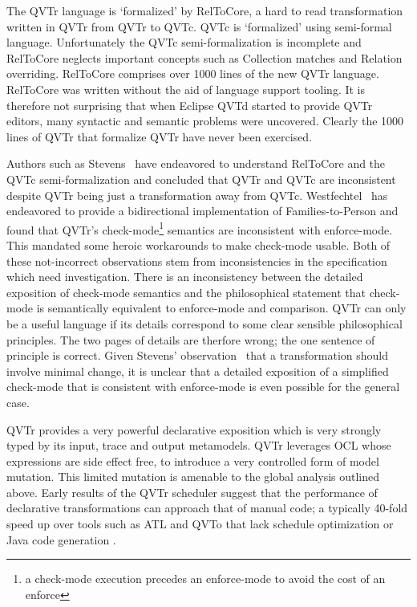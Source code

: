 \documentclass{llncs}
\begin{document}
The QVTr language is `formalized' by RelToCore, a hard to read transformation written in QVTr from QVTr to QVTc. QVTc is `formalized' using semi-formal language. Unfortunately the QVTc semi-formalization is incomplete and RelToCore neglects important concepts such as Collection matches and Relation overriding. RelToCore comprises over 1000 lines of the new QVTr language. RelToCore was written without the aid of language support tooling. It is therefore not surprising that when Eclipse QVTd started to provide QVTr editors, many syntactic and semantic problems were uncovered. Clearly the 1000 lines of QVTr that formalize QVTr have never been exercised.

Authors such as Stevens~\cite{Stevens-game} have endeavored to understand RelToCore and the QVTc semi-formalization and concluded that QVTr and QVTc are inconsistent despite QVTr being just a transformation away from QVTc. Westfechtel~\cite{Westfechtel} has endeavored to provide a bidirectional implementation of Families-to-Person and found that QVTr's check-mode\footnote{a check-mode execution precedes an enforce-mode to avoid the cost of an enforce} semantics are inconsistent with enforce-mode. This mandated some heroic workarounds to make check-mode usable. Both of these not-incorrect observations stem from inconsistencies in the specification which need investigation. There is an inconsistency between the detailed exposition of check-mode semantics and the philosophical statement that check-mode is semantically equivalent to enforce-mode and comparison. QVTr can only be a useful language if its details correspond to some clear sensible philosophical principles. The two pages of details are therfore wrong; the one sentence of principle is correct. Given Stevens' observation~\cite{Stevens-bitx} that a transformation should involve minimal change, it is unclear that a detailed exposition of a simplified check-mode that is consistent with enforce-mode is even possible for the general case.

QVTr provides a very powerful declarative exposition which is very strongly typed by its input, trace and output metamodels. QVTr leverages OCL whose expressions are side effect free, to introduce a very controlled form of model mutation. This limited mutation is amenable to the global analysis outlined above. Early results of the QVTr scheduler suggest that the performance of declarative transformations can approach that of manual code; a typically 40-fold speed up over tools such as ATL and QVTo that lack schedule optimization or Java code generation \cite{Willink-ICMT2017}.  
\end{document}

